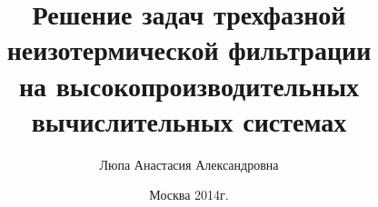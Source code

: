 \documentclass[10pt,pdf,hyperref={unicode}]{beamer} %
\title{ Решение задач трехфазной неизотермической фильтрации \\
на высокопроизводительных вычислительных системах}
\author{Люпа Анастасия Александровна}
\institute{Московский физико-технический институт \\
(государственный университет)\\
Факультет управления и прикладной математики \\
Кафедра математического моделирования \\
    \vspace{0.2cm}
    Научный руководитель: с.н.с., к.ф.-м.н. Чурбанова Н.Г.\\
}
\date{
    Москва 2014г.
}
\begin{document}
\begin{frame}
  \maketitle
\end{frame}






\end{document}
